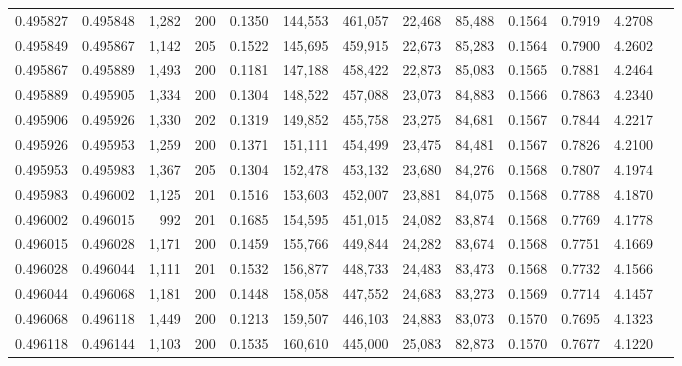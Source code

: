 \begin{tabular}{rrrrrrrrrrrrr}
0.495827 & 0.495848 & 1,282 & 200 &                                     0.1350 & 144,553 & 461,057 &  22,468 &  85,488 & 0.1564 & 0.7919 & 4.2708 \\
0.495849 & 0.495867 & 1,142 & 205 &                                     0.1522 & 145,695 & 459,915 &  22,673 &  85,283 & 0.1564 & 0.7900 & 4.2602 \\
0.495867 & 0.495889 & 1,493 & 200 &                                     0.1181 & 147,188 & 458,422 &  22,873 &  85,083 & 0.1565 & 0.7881 & 4.2464 \\
0.495889 & 0.495905 & 1,334 & 200 &                                     0.1304 & 148,522 & 457,088 &  23,073 &  84,883 & 0.1566 & 0.7863 & 4.2340 \\
0.495906 & 0.495926 & 1,330 & 202 &                                     0.1319 & 149,852 & 455,758 &  23,275 &  84,681 & 0.1567 & 0.7844 & 4.2217 \\
0.495926 & 0.495953 & 1,259 & 200 &                                     0.1371 & 151,111 & 454,499 &  23,475 &  84,481 & 0.1567 & 0.7826 & 4.2100 \\
0.495953 & 0.495983 & 1,367 & 205 &                                     0.1304 & 152,478 & 453,132 &  23,680 &  84,276 & 0.1568 & 0.7807 & 4.1974 \\
0.495983 & 0.496002 & 1,125 & 201 &                                     0.1516 & 153,603 & 452,007 &  23,881 &  84,075 & 0.1568 & 0.7788 & 4.1870 \\
0.496002 & 0.496015 &   992 & 201 &                                     0.1685 & 154,595 & 451,015 &  24,082 &  83,874 & 0.1568 & 0.7769 & 4.1778 \\
0.496015 & 0.496028 & 1,171 & 200 &                                     0.1459 & 155,766 & 449,844 &  24,282 &  83,674 & 0.1568 & 0.7751 & 4.1669 \\
0.496028 & 0.496044 & 1,111 & 201 &                                     0.1532 & 156,877 & 448,733 &  24,483 &  83,473 & 0.1568 & 0.7732 & 4.1566 \\
0.496044 & 0.496068 & 1,181 & 200 &                                     0.1448 & 158,058 & 447,552 &  24,683 &  83,273 & 0.1569 & 0.7714 & 4.1457 \\
0.496068 & 0.496118 & 1,449 & 200 &                                     0.1213 & 159,507 & 446,103 &  24,883 &  83,073 & 0.1570 & 0.7695 & 4.1323 \\
0.496118 & 0.496144 & 1,103 & 200 &                                     0.1535 & 160,610 & 445,000 &  25,083 &  82,873 & 0.1570 & 0.7677 & 4.1220 \\

\end{tabular}
